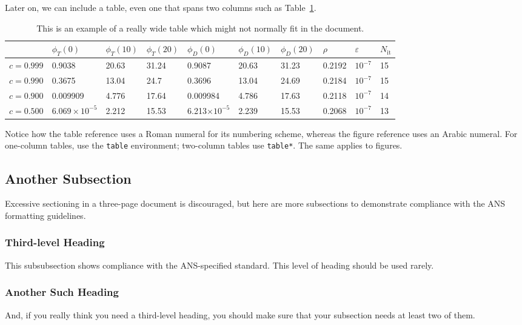\documentclass{anstrans}
\begin{document}
Later on, we can include a table, even one that spans two columns such as
Table~\ref{tab:widetable}.
\begin{table}[htb]
  \centering
\begin{tabular}{llllllllll}\toprule
      & $\phi_T(0)$      & $\phi_T(10)$      & $\phi_T(20)$      &
      $\phi_D(0)$      & $\phi_D(10)$      & $\phi_D(20)$      & $\rho$      &
      $\varepsilon$      & $N_\text{it}$
\\ \midrule
$c=0.999$  & 0.9038 & 20.63 & 31.24 & 0.9087 & 20.63 & 31.23 & 0.2192 & $10^{-7}$ & 15
\\
$c=0.990$  & 0.3675 & 13.04 & 24.7 & 0.3696 & 13.04 & 24.69 & 0.2184 & $10^{-7}$ & 15
\\
$c=0.900$  & 0.009909 & 4.776 & 17.64 & 0.009984 & 4.786 & 17.63 & 0.2118 & $10^{-7}$ & 14
\\
$c=0.500$  & $6.069\times 10^{-5}$ & 2.212 & 15.53 & 6.213$\times 10^{-5}$ & 2.239 & 15.53 & 0.2068 & $10^{-7}$ & 13
\\
\bottomrule
\end{tabular}
  \caption{This is an example of a really wide table which might not normally
  fit in the document.}
  \label{tab:widetable}
\end{table}
Notice how the table reference uses a Roman numeral
for its numbering scheme, whereas the figure reference uses an Arabic numeral.
For one-column tables, use the \verb|table| environment; two-column tables use
\verb|table*|. The same applies to figures.

\subsection{Another Subsection}
Excessive sectioning in a three-page document is discouraged, but here are more
subsections to demonstrate compliance with the ANS formatting guidelines.

\subsubsection{Third-level Heading}
This subsubsection shows compliance with the ANS-specified standard. This level
of heading should be used rarely.

\subsubsection{Another Such Heading}
And, if you really think you need a third-level heading, you should make sure
that your subsection needs at least two of them.
\end{document}
